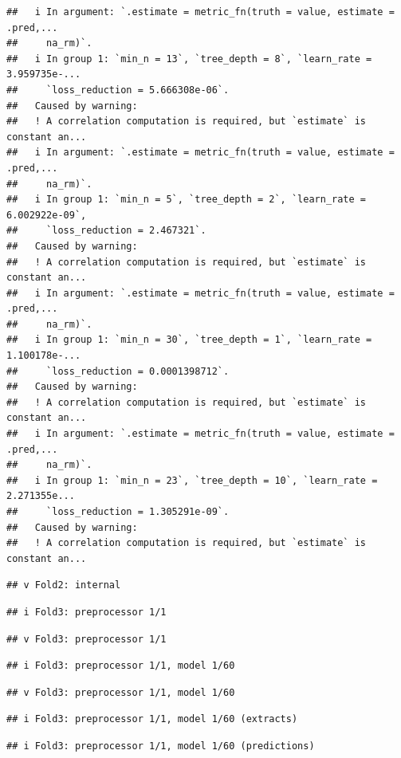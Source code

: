 \documentclass[
]{article}
\begin{document}
\begin{verbatim}
##   i In argument: `.estimate = metric_fn(truth = value, estimate = .pred,...
##     na_rm)`.
##   i In group 1: `min_n = 13`, `tree_depth = 8`, `learn_rate = 3.959735e-...
##     `loss_reduction = 5.666308e-06`.
##   Caused by warning:
##   ! A correlation computation is required, but `estimate` is constant an...
##   i In argument: `.estimate = metric_fn(truth = value, estimate = .pred,...
##     na_rm)`.
##   i In group 1: `min_n = 5`, `tree_depth = 2`, `learn_rate = 6.002922e-09`,
##     `loss_reduction = 2.467321`.
##   Caused by warning:
##   ! A correlation computation is required, but `estimate` is constant an...
##   i In argument: `.estimate = metric_fn(truth = value, estimate = .pred,...
##     na_rm)`.
##   i In group 1: `min_n = 30`, `tree_depth = 1`, `learn_rate = 1.100178e-...
##     `loss_reduction = 0.0001398712`.
##   Caused by warning:
##   ! A correlation computation is required, but `estimate` is constant an...
##   i In argument: `.estimate = metric_fn(truth = value, estimate = .pred,...
##     na_rm)`.
##   i In group 1: `min_n = 23`, `tree_depth = 10`, `learn_rate = 2.271355e...
##     `loss_reduction = 1.305291e-09`.
##   Caused by warning:
##   ! A correlation computation is required, but `estimate` is constant an...
\end{verbatim}

\begin{verbatim}
## v Fold2: internal
\end{verbatim}

\begin{verbatim}
## i Fold3: preprocessor 1/1
\end{verbatim}

\begin{verbatim}
## v Fold3: preprocessor 1/1
\end{verbatim}

\begin{verbatim}
## i Fold3: preprocessor 1/1, model 1/60
\end{verbatim}

\begin{verbatim}
## v Fold3: preprocessor 1/1, model 1/60
\end{verbatim}

\begin{verbatim}
## i Fold3: preprocessor 1/1, model 1/60 (extracts)
\end{verbatim}

\begin{verbatim}
## i Fold3: preprocessor 1/1, model 1/60 (predictions)
\end{verbatim}
\end{document}
